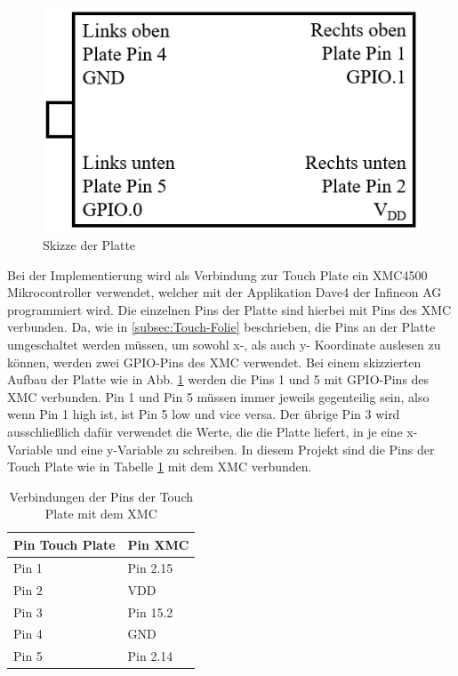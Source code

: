 \documentclass[12pt,a4paper,bibliography=totoc,listof=totoc]{scrartcl}
\begin{document}
\begin{figure}[htbp]
	\centering
	\includegraphics[scale = 0.6]{pics/PlatteSkizze.png}
	\caption{Skizze der Platte} 
	\label{fig:PlatteSkizze}
\end{figure}

Bei der Implementierung wird als Verbindung zur Touch Plate ein XMC4500 Mikrocontroller verwendet, welcher mit der Applikation Dave4 der Infineon AG programmiert wird.
Die einzelnen Pins der Platte sind hierbei mit Pins des XMC verbunden. Da, wie in \ref{subsec:Touch-Folie} beschrieben, die Pins an der Platte umgeschaltet werden müssen, um sowohl x-, als auch y- Koordinate auslesen zu können, werden zwei GPIO-Pins des XMC verwendet. Bei einem skizzierten Aufbau der Platte wie in Abb. \ref{fig:PlatteSkizze} werden die Pins 1 und 5 mit GPIO-Pins des XMC verbunden. Pin 1 und Pin 5 müssen immer jeweils gegenteilig sein, also wenn Pin 1 high ist, ist Pin 5 low und vice versa.
Der übrige Pin 3 wird ausschließlich dafür verwendet die Werte, die die Platte liefert, in je eine x-Variable und eine y-Variable zu schreiben. 
In diesem Projekt sind die Pins der Touch Plate wie in Tabelle \ref{tab:VerbindungenPins} mit dem XMC verbunden.

\begin{table}[]
\centering
\begin{tabular}{l|l}
Pin Touch Plate & Pin XMC \\
\hline
Pin 1           & Pin 2.15\\
Pin 2           & VDD     \\
Pin 3           & Pin 15.2    \\
Pin 4           & GND     \\
Pin 5           & Pin 2.14
\end{tabular}
\caption{Verbindungen der Pins der Touch Plate mit dem XMC \label{tab:VerbindungenPins}}
\end{table}
\end{document}
